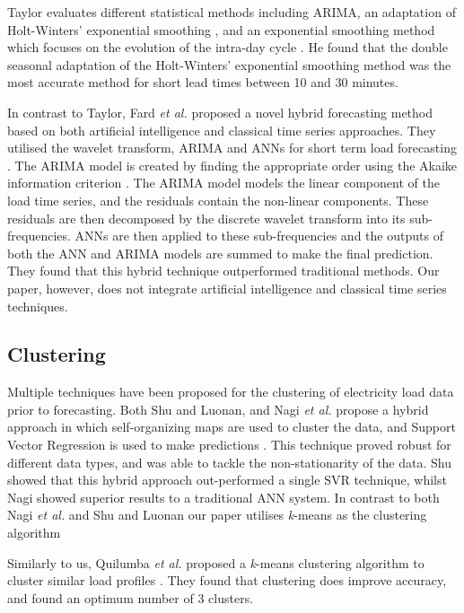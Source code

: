 Taylor evaluates different statistical methods including ARIMA, an adaptation of Holt-Winters' exponential smoothing \cite{Holt2004}, and an exponential smoothing method which focuses on the evolution of the intra-day cycle \cite{Taylor2008}. He found that the double seasonal adaptation of the Holt-Winters' exponential smoothing method was the most accurate method for short lead times between 10 and 30 minutes. 

In contrast to Taylor, Fard \textit{et al.} proposed a novel hybrid forecasting method based on both artificial intelligence and classical time series approaches. They utilised the wavelet transform, ARIMA and ANNs for short term load forecasting \cite{Fard2014}. The ARIMA model is created by finding the appropriate order using the Akaike information criterion \cite{Akaike1974}. The ARIMA model models the linear component of the load time series, and the residuals contain the non-linear components. These residuals are then decomposed by the discrete wavelet transform into its sub-frequencies. ANNs are then applied to these sub-frequencies and the outputs of both the ANN and ARIMA models are summed to make the final prediction. They found that this hybrid technique outperformed traditional methods. Our paper, however, does not integrate artificial intelligence and classical time series techniques.

\subsection{Clustering}

Multiple techniques have been proposed for the clustering of electricity load data prior to forecasting. Both Shu and Luonan, and Nagi \textit{et al.} propose a hybrid approach in which self-organizing maps are used to cluster the data, and Support Vector Regression is used to make predictions \cite{Shu2006,Tiong2008}. This technique proved robust for different data types, and was able to tackle the non-stationarity of the data. Shu showed that this hybrid approach out-performed a single SVR technique, whilst Nagi showed superior results to a traditional ANN system. In contrast to both Nagi \textit{et al.} and Shu and Luonan our paper utilises \textit{k}-means as the clustering algorithm 

Similarly to us, Quilumba \textit{et al.} proposed a \textit{k}-means clustering algorithm to cluster similar load profiles \cite{Quilumba2014}. They found that clustering does improve accuracy, and found an optimum number of 3 clusters.

